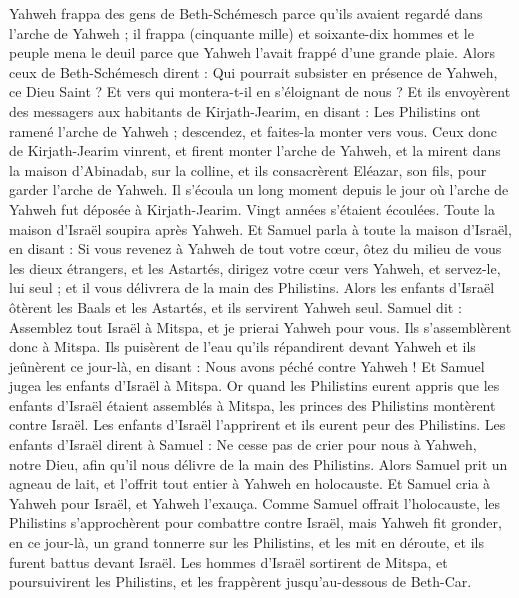 \begin{multicols}{2}
Yahweh frappa des gens de Beth-Schémesch parce qu'ils avaient regardé dans l'arche de Yahweh ; il frappa (cinquante mille) et soixante-dix hommes et le peuple mena le deuil parce que Yahweh l'avait frappé d'une grande plaie.
Alors ceux de Beth-Schémesch dirent : Qui pourrait subsister en présence de Yahweh, ce Dieu Saint ? Et vers qui montera-t-il en s'éloignant de nous ?
Et ils envoyèrent des messagers aux habitants de Kirjath-Jearim, en disant : Les Philistins ont ramené l'arche de Yahweh ; descendez, et faites-la monter vers vous.
\VerseOne{}Ceux donc de Kirjath-Jearim vinrent, et firent monter l'arche de Yahweh, et la mirent dans la maison d'Abinadab, sur la colline, et ils consacrèrent Eléazar, son fils, pour garder l'arche de Yahweh.
Il s'écoula un long moment depuis le jour où l'arche de Yahweh fut déposée à Kirjath-Jearim. Vingt années s'étaient écoulées. Toute la maison d'Israël soupira après Yahweh.
Et Samuel parla à toute la maison d'Israël, en disant : Si vous revenez à Yahweh de tout votre cœur, ôtez du milieu de vous les dieux étrangers, et les Astartés, dirigez votre cœur vers Yahweh, et servez-le, lui seul ; et il vous délivrera de la main des Philistins.
Alors les enfants d'Israël ôtèrent les Baals et les Astartés, et ils servirent Yahweh seul.
Samuel dit : Assemblez tout Israël à Mitspa, et je prierai Yahweh pour vous.
Ils s'assemblèrent donc à Mitspa. Ils puisèrent de l'eau qu'ils répandirent devant Yahweh et ils jeûnèrent ce jour-là, en disant : Nous avons péché contre Yahweh ! Et Samuel jugea les enfants d'Israël à Mitspa.
Or quand les Philistins eurent appris que les enfants d'Israël étaient assemblés à Mitspa, les princes des Philistins montèrent contre Israël. Les enfants d'Israël l'apprirent et ils eurent peur des Philistins.
Les enfants d'Israël dirent à Samuel : Ne cesse pas de crier pour nous à Yahweh, notre Dieu, afin qu'il nous délivre de la main des Philistins.
Alors Samuel prit un agneau de lait, et l'offrit tout entier à Yahweh en holocauste. Et Samuel cria à Yahweh pour Israël, et Yahweh l'exauça.
Comme Samuel offrait l'holocauste, les Philistins s'approchèrent pour combattre contre Israël, mais Yahweh fit gronder, en ce jour-là, un grand tonnerre sur les Philistins, et les mit en déroute, et ils furent battus devant Israël.
Les hommes d'Israël sortirent de Mitspa, et poursuivirent les Philistins, et les frappèrent jusqu'au-dessous de Beth-Car.

\end{multicols}
